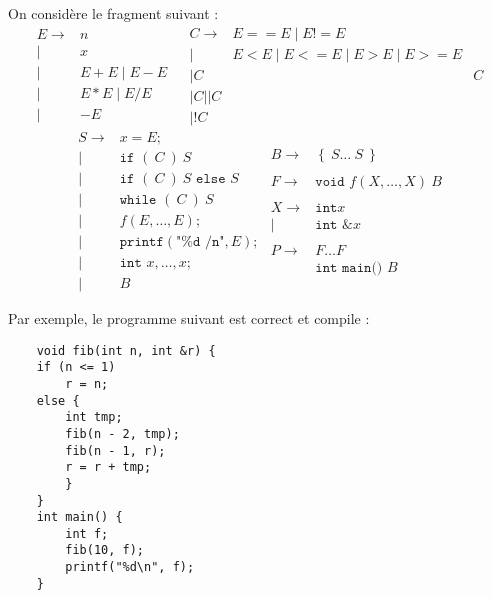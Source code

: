 \documentclass{cours}
\begin{document}
On considère le fragment suivant : 
\[
    \begin{aligned}
        E \rightarrow & n &\\
        \mid & x &\\
        \mid & E + E \mid E - E\\
        \mid & E * E \mid E/E\\
        \mid & - E
    \end{aligned}    
    \begin{aligned}
        C \rightarrow & E == E \mid E!= E \\
        \mid & E<E \mid E<= E \mid E > E \mid E >= E\\
        \mid C && C\\
        \mid C || C \\
        \mid !C
    \end{aligned}
\]
\[
    \begin{aligned}
        S \rightarrow & x = E;\\
        \mid & \texttt{if } (\ C\ )\ S\\
        \mid & \texttt{if } (\ C\ )\ S \texttt{ else } S\\
        \mid & \texttt{while } (\ C\ )\ S\\
        \mid & f(E, \ldots, E);\\
        \mid & \texttt{printf}(\texttt{"\%d /n"}, E);\\
        \mid & \texttt{int } x, \ldots, x;\\
        \mid & B
    \end{aligned}    
    \begin{aligned}
        B \rightarrow & \left\{\ S \ldots\ S\ \right\}\\
        & \\
        F \rightarrow &\texttt{void } f(X, \ldots, X) \ B\\
        & \\
        X \rightarrow& \texttt{int} x\\
        \mid & \texttt{int } \texttt{\&}x\\
        & \\
        P \rightarrow &F \ldots F\\
        &\texttt{int main() } B
    \end{aligned}
\]

Par exemple, le programme suivant est correct et compile :
\begin{verbatim}
    void fib(int n, int &r) {
    if (n <= 1)
        r = n;
    else {
        int tmp;
        fib(n - 2, tmp);
        fib(n - 1, r);
        r = r + tmp;
        }
    }
    int main() {
        int f;
        fib(10, f);
        printf("%d\n", f);
    }
\end{verbatim}
\end{document}
